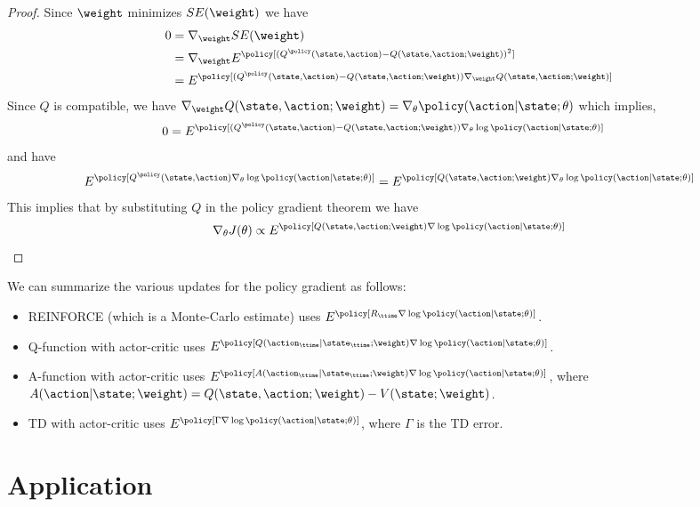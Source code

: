 \begin{proof}
Since $\weight$ minimizes $SE(\weight)$ we have
\begin{align*}
0 & = \nabla_\weight SE(\weight)\\
&= \nabla_\weight E^\policy[(Q^\policy(\state,\action)-Q(\state,\action;\weight))^2]\\
&=
E^\policy[(Q^\policy(\state,\action)-Q(\state,\action;\weight))\nabla_\weight
Q(\state,\action;\weight)]
\end{align*}
Since $Q$ is compatible, we have $\nabla_\weight
Q(\state,\action;\weight)= \nabla_\theta
\policy(\action|\state;\theta)$ which implies,
\begin{align*}
0&=
E^\policy[(Q^\policy(\state,\action)-Q(\state,\action;\weight))\nabla_\theta
\log \policy(\action|\state;\theta)]
\end{align*}
and have
\begin{align*}
 E^\policy[Q^\policy(\state,\action)\nabla_\theta \log \policy(\action|\state;\theta)] = E^\policy[Q(\state,\action;\weight)\nabla_\theta \log \policy(\action|\state;\theta)]
\end{align*}
This implies that by substituting $Q$ in the policy gradient theorem
we have
\[
\nabla_\theta J(\theta) \propto E^\policy[Q(\state,\action;\weight)
\nabla \log \policy(\action|\state;\theta)]
\]
\end{proof}

We can summarize the various updates for the policy gradient as
follows:
\begin{itemize}
\item REINFORCE (which is a Monte-Carlo estimate) uses
$E^\policy[R_\ttime \nabla\log\policy(\action|\state;\theta) ]$.
\item Q-function with actor-critic uses
$E^\policy[Q(\action_\ttime|\state_\ttime;\weight)
\nabla\log\policy(\action|\state;\theta) ]$.
\item A-function with actor-critic uses
$E^\policy[A(\action_\ttime|\state_\ttime;\weight)
\nabla\log\policy(\action|\state;\theta) ]$, where
$A(\action|\state;\weight)=Q(\state,\action;\weight)-V(\state;\weight)$.
\item TD with actor-critic uses
$E^\policy[\Gamma\nabla\log\policy(\action|\state;\theta) ]$, where
$\Gamma$ is the TD error.
\end{itemize}

\section{Application}

